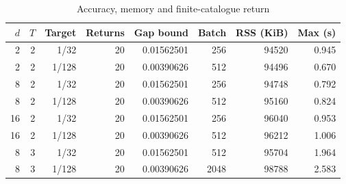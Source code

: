 \begin{table}[htbp]
\centering\caption{Accuracy, memory and finite-catalogue return}\label{tab:reliability65}
{\small\setlength{\tabcolsep}{4pt}
\begin{tabular}{rrrrrrrr}
\toprule
$d$ & $T$ & Target & Returns & Gap bound & Batch & RSS (KiB) & Max (s) \\
\midrule
2 & 2 & 1/32 & 20 & 0.01562501 & 256 & 94520 & 0.945 \\
2 & 2 & 1/128 & 20 & 0.00390626 & 512 & 94496 & 0.670 \\
8 & 2 & 1/32 & 20 & 0.01562501 & 256 & 94748 & 0.792 \\
8 & 2 & 1/128 & 20 & 0.00390626 & 512 & 95160 & 0.824 \\
16 & 2 & 1/32 & 20 & 0.01562501 & 256 & 96040 & 0.953 \\
16 & 2 & 1/128 & 20 & 0.00390626 & 512 & 96212 & 1.006 \\
8 & 3 & 1/32 & 20 & 0.01562501 & 512 & 95704 & 1.964 \\
8 & 3 & 1/128 & 20 & 0.00390626 & 2048 & 98788 & 2.583 \\
\bottomrule
\end{tabular}}
\par{}
\end{table}
